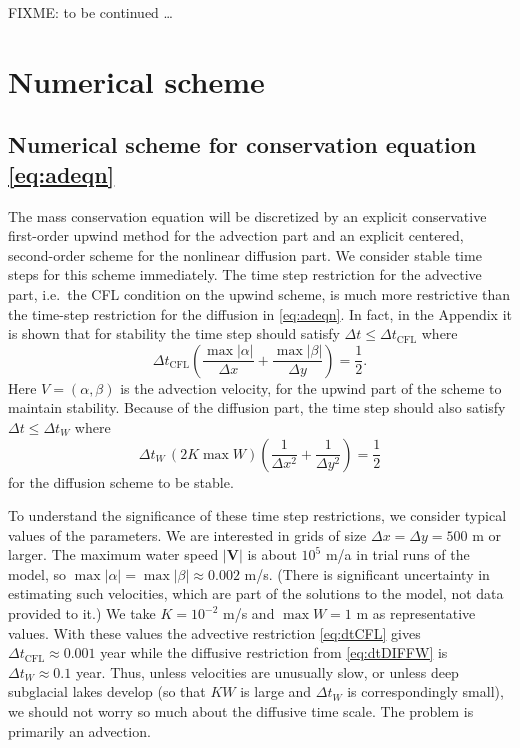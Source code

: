 \documentclass[11pt,final]{amsart}%
\newcommand\bV{\mathbf{V}}
\begin{document}
FIXME: to be continued \dots



\section{Numerical scheme}  \label{sec:num}

\subsection*{Numerical scheme for conservation equation \eqref{eq:adeqn}}  The mass conservation equation will be discretized by an explicit conservative first-order upwind method for the advection part and an explicit centered, second-order scheme for the nonlinear diffusion part.  We consider stable time steps for this scheme immediately.  The time step restriction for the advective part, i.e.~the CFL condition on the upwind scheme, is much more restrictive than the time-step restriction for the diffusion in \eqref{eq:adeqn}.  In fact, in the Appendix it is shown that for stability the time step should satisfy $\Delta t \le \Delta t_{\text{CFL}}$ where
\begin{equation}
\Delta t_{\text{CFL}} \left(\frac{\max |\alpha|}{\Delta x} + \frac{\max |\beta|}{\Delta y}\right) = \frac{1}{2}. \label{eq:dtCFL}
\end{equation}
Here $V=(\alpha,\beta)$ is the advection velocity, for the upwind part of the scheme to maintain stability.  Because of the diffusion part, the time step should also satisfy $\Delta t \le \Delta t_{W}$ where
\begin{equation}
\Delta t_W\, (2 K \max W) \left(\frac{1}{\Delta x^2} + \frac{1}{\Delta y^2}\right) = \frac{1}{2} \label{eq:dtDIFFW}
\end{equation}
for the diffusion scheme to be stable.

To understand the significance of these time step restrictions, we consider typical values of the parameters.  We are interested in grids of size $\Delta x = \Delta y = 500$ m or larger.  The maximum water speed $|\bV|$ is about $10^5$ m/a in trial runs of the model, so $\max |\alpha| = \max |\beta| \approx 0.002$ m/s.  (There is significant uncertainty in estimating such velocities, which are part of the solutions to the model, not data provided to it.)  We take $K=10^{-2}$ m/s and $\max W=1$ m as representative values.  With these values the advective restriction \eqref{eq:dtCFL} gives $\Delta t_{\text{CFL}} \approx 0.001$ year while the diffusive restriction from \eqref{eq:dtDIFFW} is $\Delta t_W \approx 0.1$ year.  Thus, unless velocities are unusually slow, or unless deep subglacial lakes develop (so that $KW$ is large and $\Delta t_W$ is correspondingly small), we should not worry so much about the diffusive time scale.  The problem is primarily an advection.
\end{document}
